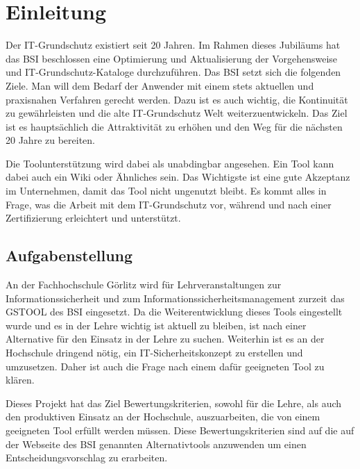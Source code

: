 \section{Einleitung}
Der IT-Grundschutz existiert seit 20 Jahren. Im Rahmen dieses Jubiläums hat das BSI beschlossen eine Optimierung und Aktualisierung der Vorgehensweise und IT-Grundschutz-Kataloge durchzuführen\cite{bsi}. Das BSI setzt sich die folgenden Ziele. Man will dem Bedarf der Anwender mit einem stets aktuellen und praxisnahen Verfahren gerecht werden. Dazu ist es auch wichtig, die Kontinuität zu gewährleisten und die alte IT-Grundschutz Welt weiterzuentwickeln. Das Ziel ist es hauptsächlich die Attraktivität zu erhöhen und den Weg für die nächsten 20 Jahre zu bereiten.

Die Toolunterstützung wird dabei als unabdingbar angesehen. Ein Tool kann dabei auch ein Wiki oder Ähnliches sein. Das Wichtigste ist eine gute Akzeptanz im Unternehmen, damit das Tool nicht ungenutzt bleibt. Es kommt alles in Frage, was die Arbeit mit dem IT-Grundschutz vor, während und nach einer Zertifizierung erleichtert und unterstützt.

\subsection{Aufgabenstellung}
An der Fachhochschule Görlitz wird für Lehrveranstaltungen zur Informationssicherheit und zum
Informationssicherheitsmanagement zurzeit das GSTOOL des BSI eingesetzt. Da die Weiterentwicklung dieses Tools eingestellt wurde und es in der Lehre wichtig ist aktuell zu bleiben, ist nach einer Alternative für den Einsatz in der Lehre zu suchen. 
Weiterhin ist es an der Hochschule dringend nötig, ein IT-Sicherheitskonzept zu erstellen und umzusetzen. Daher ist auch die Frage nach einem dafür geeigneten Tool zu klären. 

Dieses Projekt hat das Ziel Bewertungskriterien, sowohl für die Lehre, als auch den produktiven Einsatz an der Hochschule, auszuarbeiten, die von einem geeigneten Tool erfüllt werden müssen. Diese Bewertungskriterien sind auf die auf der Webseite des BSI genannten Alternativtools anzuwenden um einen Entscheidungsvorschlag zu erarbeiten.
